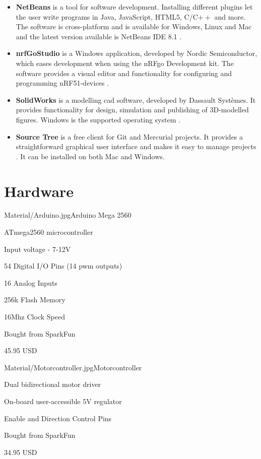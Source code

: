 \begin{itemize}
    \item \textbf{NetBeans} is a tool for software development. Installing different plugins let the user write programs in Java, JavaScript, HTML5, C/C$++$ and more. The software is cross-platform and is available for Windows, Linux and Mac and the latest version available is NetBeans IDE 8.1 \cite{netbeans}.
    \item \textbf{nrfGoStudio} is a Windows application, developed by Nordic Semiconductor, which eases development when using the nRFgo Development kit. The software provides a visual editor and functionality for configuring and programming nRF51-devices \cite{nrfgo}.
    \item \textbf{SolidWorks} is a modelling \acrshort{cad} software, developed by Dassault Systèmes. It provides functionality for design, simulation and publishing of 3D-modelled figures. Windows is the supported operating system \cite{solidworks}.
    \item \textbf{Source Tree} is a free client for Git and Mercurial projects. It provides a straightforward graphical user interface and makes it easy to manage projects \cite{sourcetree}. It can be installed on both Mac and Windows.
\end{itemize}
\newpage
\section{Hardware}
\label{sec:hardware}

\begin{material}{Material/Arduino.jpg}{Arduino Mega 2560 \cite{sparkfun} }
\item ATmega2560 microcontroller
\item Input voltage - 7-12V
\item 54 Digital I/O Pins (14 \acrfull{pwm} outputs)
\item 16 Analog Inputs
\item 256k Flash Memory
\item 16Mhz Clock Speed
\item Bought from SparkFun
\item 45.95 USD
\end{material}

\begin{material}{Material/Motorcontroller.jpg}{Motorcontroller \cite{sparkfun} }
\item Dual bidirectional motor driver
\item On-board user-accessible 5V regulator 
\item Enable and Direction Control Pins
\item Bought from SparkFun
\item 34.95 USD
\end{material}


